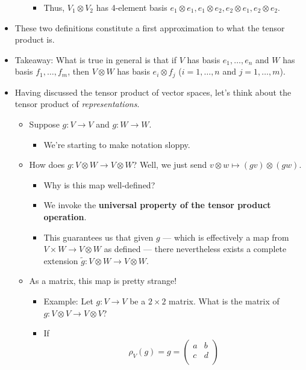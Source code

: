 \documentclass[../notes.tex]{subfiles}
\begin{document}
\begin{itemize}
\begin{itemize}
\begin{itemize}
            \item Thus, $V_1\otimes V_2$ has 4-element basis $e_1\otimes e_1,e_1\otimes e_2,e_2\otimes e_1,e_2\otimes e_2$.
        \end{itemize}
    \end{itemize}
    \item These two definitions constitute a first approximation to what the tensor product is.
    \item Takeaway: What is true in general is that if $V$ has basis $e_1,\dots,e_n$ and $W$ has basis $f_1,\dots,f_m$, then $V\otimes W$ has basis $e_i\otimes f_j$ ($i=1,\dots,n$ and $j=1,\dots,m$).
    \item Having discussed the tensor product of vector spaces, let's think about the tensor product of \emph{representations}.
    \begin{itemize}
        \item Suppose $g:V\to V$ and $g:W\to W$.
        \begin{itemize}
            \item We're starting to make notation sloppy.
        \end{itemize}
        \item How does $g:V\otimes W\to V\otimes W$? Well, we just send $v\otimes w\mapsto(gv)\otimes(gw)$.
        \begin{itemize}
            \item Why is this map well-defined?
            \item We invoke the \textbf{universal property of the tensor product operation}.
            \item This guarantees us that given $g$ --- which is effectively a map from $V\times W\to V\otimes W$ as defined --- there nevertheless exists a complete extension $\tilde{g}:V\otimes W\to V\otimes W$.
        \end{itemize}
        \item As a matrix, this map is pretty strange!
        \begin{itemize}
            \item Example: Let $g:V\to V$ be a $2\times 2$ matrix. What is the matrix of $g:V\otimes V\to V\otimes V$?
            \item If
            \begin{equation*}
                \rho_V(g) = g =
                \begin{pmatrix}
                    a & b\\
                    c & d\\

\end{pmatrix}
\end{equation*}
\end{itemize}
\end{itemize}
\end{itemize}
\end{document}
